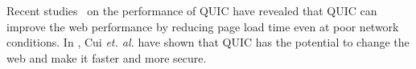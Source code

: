 Recent studies~\cite{quicisquic, carlucci2015http,lychev2015secure,biswal2016} on the performance of QUIC have revealed that QUIC can improve the web performance by reducing page load time even at poor network conditions. 
%
In \cite{cui2017innovating}, Cui \textit{et. al.} have shown that QUIC has the potential to change the web and make it faster and more secure. 
